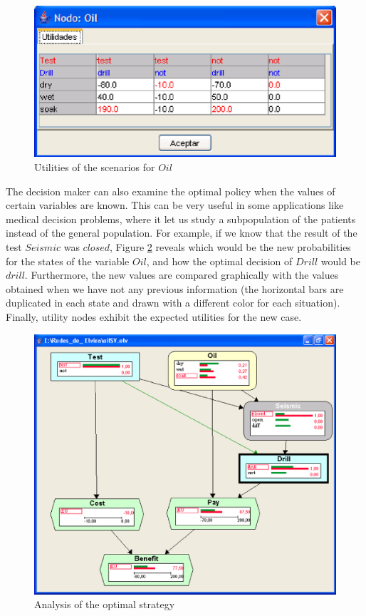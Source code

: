 \begin{figure}[h]
\begin{center}
\includegraphics[scale=0.4]{./ID/fig/utilPosteriori.eps} \vspace{-0.5cm}
\end{center}
\caption{Utilities of the scenarios for $Oil$}
\label{fig:utilPosteriori}
\end{figure}

The decision maker can also examine the optimal policy when the
values of certain variables are known. This can be very useful in
some applications like medical decision problems, where it let us
study a subpopulation of the patients instead of the general
population. For example, if we know that the result of the test
$Seismic$ was $closed$, Figure \ref{fig:evaluatedCaseReactorIDSVGUI}
reveals which would be the new probabilities for the states of the
variable $Oil$, and how the optimal decision of $Drill$ would be
$drill$. Furthermore, the new values are compared graphically with
the values obtained when we have not any previous information (the
horizontal bars are duplicated in each state and drawn with a
different color for each situation). Finally, utility nodes exhibit
the expected utilities for the new case.

\begin{figure}[h]
\begin{center}
\includegraphics[scale=0.35]{./ID/fig/evaluatedCaseReactorIDSVGUI.eps} \vspace{-0.5cm}
\end{center}
\caption{Analysis of the optimal strategy}
\label{fig:evaluatedCaseReactorIDSVGUI}
\end{figure}

